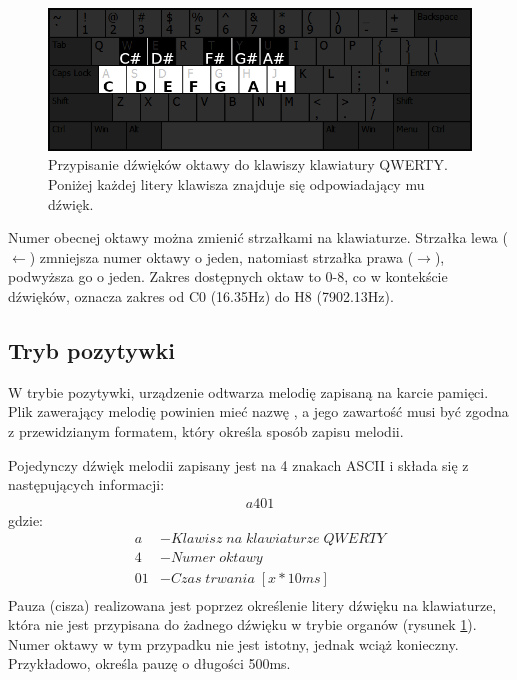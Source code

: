 \documentclass[a4paper,12pt]{article}
\begin{document}
\begin{figure}[h]
  \centering
  \includegraphics[width=\linewidth]{images/key_mapping.png}
  \caption{Przypisanie dźwięków oktawy do klawiszy klawiatury QWERTY. Poniżej każdej litery klawisza znajduje się odpowiadający mu dźwięk.}
  \label{key_mapping_user_manual}
\end{figure}

Numer obecnej oktawy można zmienić strzałkami na klawiaturze. Strzałka lewa ($\leftarrow$) zmniejsza numer oktawy o jeden, natomiast strzałka prawa ($\rightarrow$), podwyższa go o jeden. Zakres dostępnych oktaw to 0-8, co w kontekście dźwięków, oznacza zakres od C0 (16.35Hz) do H8 (7902.13Hz).

\clearpage
\subsection{Tryb pozytywki}

W trybie pozytywki, urządzenie odtwarza melodię zapisaną na karcie pamięci. Plik zawerający melodię powinien mieć nazwę , a jego zawartość musi być zgodna z przewidzianym formatem, który określa sposób zapisu melodii.

Pojedynczy dźwięk melodii zapisany jest na 4 znakach ASCII i składa się z następujących informacji:
\begin{align*}
  a401
\end{align*}
gdzie:
\begin{align*}
  a                & - Klawisz\;na\;klawiaturze\;QWERTY \\
  4                & - Numer\;oktawy                           \\
  01 & - Czas\;trwania\;[x*10ms]           \\
\end{align*}
Pauza (cisza) realizowana jest poprzez określenie litery dźwięku na klawiaturze, która nie jest przypisana do żadnego dźwięku w trybie organów (rysunek \ref{key_mapping_user_manual}). Numer oktawy w tym przypadku nie jest istotny, jednak wciąż konieczny. Przykładowo,  określa pauzę o długości 500ms.
\end{document}

